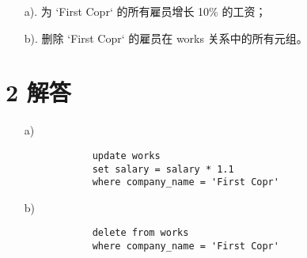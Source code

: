 \documentclass{article}
\begin{document}
	\begin{enumerate}
		\item[a).] 为 `First Copr` 的所有雇员增长 10\% 的工资；
		\item[b).] 删除 `First Copr` 的雇员在 works 关系中的所有元组。
	\end{enumerate}
	
	\section*{2 解答}
	
	\begin{enumerate}[noitemsep, label={{\arabic*})}]
		\item[a)] 
		
		\begin{verbatim}
			update works
			set salary = salary * 1.1
			where company_name = 'First Copr'
		\end{verbatim}
		
		\item[b)]
		
		\begin{verbatim}
			delete from works
			where company_name = 'First Copr'
		\end{verbatim}
		
	\end{enumerate}\textbf{}
	
\end{document}
